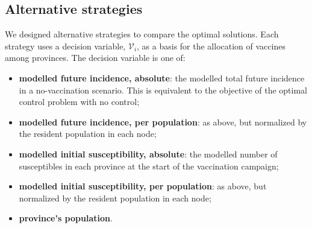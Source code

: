\subsection*{Alternative strategies}
We designed alternative strategies to compare the optimal solutions. Each strategy uses a decision variable, $\mathcal{V}_i$, as a basis for the allocation of vaccines among provinces. The decision variable is one of:
\begin{itemize}
    \item \textbf{modelled future incidence, absolute}: the modelled total future incidence in a no-vaccination scenario. This is equivalent to the objective of the optimal control problem with no control;
    \item \textbf{modelled future incidence, per population}: as above, but normalized by the resident population in each node;
    \item \textbf{modelled initial susceptibility, absolute}: the modelled number of susceptibles in each province at the start of the vaccination campaign;
    \item \textbf{modelled initial susceptibility, per population}: as above, but normalized by the resident population in each node;
    \item \textbf{province's population}.
\end{itemize}

